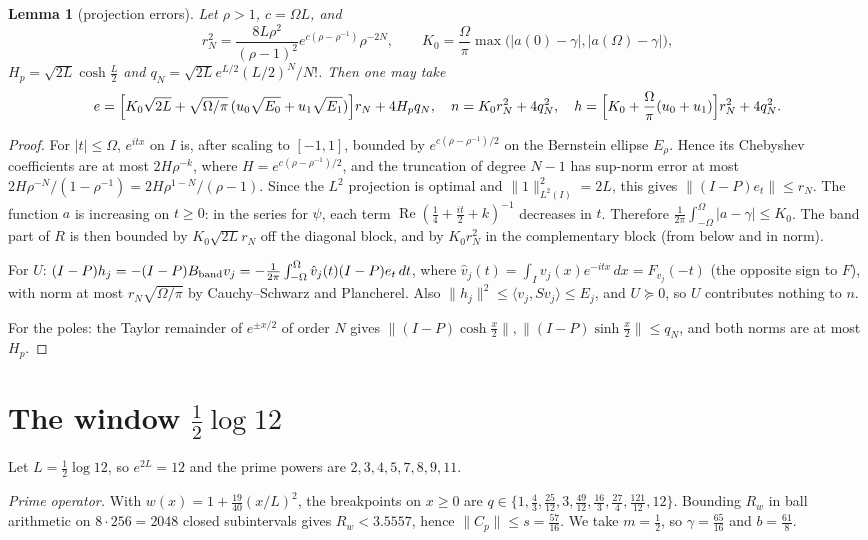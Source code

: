 \documentclass[11pt]{amsart}
\newtheorem{lemma}[proposition]{Lemma}
\theoremstyle{remark}
\numberwithin{equation}{section}
\begin{document}
\begin{lemma}[projection errors]\label{lem:proj}
Let $\rho>1$, $c=\Omega L$, and
\[
r_N^2=\frac{8L\rho^2}{(\rho-1)^2}e^{c(\rho-\rho^{-1})}\rho^{-2N},\qquad
K_0=\frac\Omega\pi\max\bigl(|a(0)-\gamma|,|a(\Omega)-\gamma|\bigr),
\]
$H_p=\sqrt{2L}\cosh\frac L2$ and $q_N=\sqrt{2L}e^{L/2}(L/2)^N/N!$. Then one may take
\[
e=\Bigl[K_0\sqrt{2L}+\sqrt{\Omega/\pi}\,(u_0\sqrt{E_0}+u_1\sqrt{E_1})\Bigr]r_N+4H_pq_N,\quad
n=K_0r_N^2+4q_N^2,\quad
h=\Bigl[K_0+\frac\Omega\pi(u_0+u_1)\Bigr]r_N^2+4q_N^2 .
\]
\end{lemma}
\begin{proof}
For $|t|\le\Omega$, $e^{itx}$ on $I$ is, after scaling to $[-1,1]$, bounded by $e^{c(\rho-\rho^{-1})/2}$ on the Bernstein ellipse $E_\rho$. Hence its Chebyshev coefficients are at most $2H\rho^{-k}$, where $H=e^{c(\rho-\rho^{-1})/2}$, and the truncation of degree $N-1$ has sup-norm error at most $2H\rho^{-N}/(1-\rho^{-1})=2H\rho^{1-N}/(\rho-1)$. Since the $L^2$ projection is optimal and $\|1\|_{L^2(I)}^2=2L$, this gives $\|(I-P)e_t\|\le r_N$. The function $a$ is increasing on $t\ge0$: in the series for $\psi$, each term $\operatorname{Re}(\frac14+\frac{it}2+k)^{-1}$ decreases in $t$. Therefore $\frac1{2\pi}\int_{-\Omega}^\Omega|a-\gamma|\le K_0$. The band part of $R$ is then bounded by $K_0\sqrt{2L}r_N$ off the diagonal block, and by $K_0r_N^2$ in the complementary block (from below and in norm).

For $U$: $(I-P)h_j=-(I-P)B_{\rm band}v_j=-\frac1{2\pi}\int_{-\Omega}^\Omega\hat v_j(t)(I-P)e_t\,dt$, where $\hat v_j(t)=\int_Iv_j(x)e^{-itx}\,dx=F_{v_j}(-t)$ (the opposite sign to $F$), with norm at most $r_N\sqrt{\Omega/\pi}$ by Cauchy--Schwarz and Plancherel. Also $\|h_j\|^2\le\langle v_j,Sv_j\rangle\le E_j$, and $U\succeq0$, so $U$ contributes nothing to $n$.

For the poles: the Taylor remainder of $e^{\pm x/2}$ of order $N$ gives $\|(I-P)\cosh\frac x2\|,\|(I-P)\sinh\frac x2\|\le q_N$, and both norms are at most $H_p$.
\end{proof}

\section{The window \texorpdfstring{$\frac12\log12$}{(1/2) log 12}}\label{sec:mu12}
Let $L=\frac12\log12$, so $e^{2L}=12$ and the prime powers are $2,3,4,5,7,8,9,11$.

\emph{Prime operator.} With $w(x)=1+\frac{19}{40}(x/L)^2$, the breakpoints on $x\ge0$ are $q\in\{1,\frac43,\frac{25}{12},3,\frac{49}{12},\frac{16}3,\frac{27}4,\frac{121}{12},12\}$. Bounding $R_w$ in ball arithmetic on $8\cdot256=2048$ closed subintervals gives $R_w<3.5557$, hence $\|C_p\|\le s=\frac{57}{16}$. We take $m=\frac12$, so $\gamma=\frac{65}{16}$ and $b=\frac{61}8$.
\end{document}
